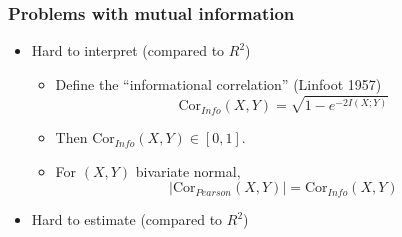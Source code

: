 \documentclass{beamer}
\begin{document}


\begin{frame}
\frametitle{Problems with mutual information}
\begin{itemize}
\item Hard to interpret (compared to $R^2$) \pause
\begin{itemize}
\item Define the ``informational correlation'' (Linfoot 1957)
\[
\text{Cor}_{Info}(X, Y) = \sqrt{1-e^{-2I(X; Y)}}
\]
\pause
\item Then $\text{Cor}_{Info}(X, Y) \in [0,1]$.
\item For $(X, Y)$ bivariate normal,
\[
|\text{Cor}_{Pearson}(X, Y)| = \text{Cor}_{Info}(X, Y)
\]
\pause
\end{itemize}
\item Hard to estimate (compared to $R^2$)
\end{itemize}
\end{frame}
\end{document}

